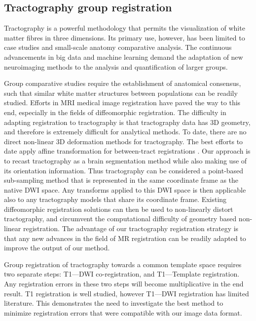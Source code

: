 \subsection{Tractography group registration}
Tractography is a powerful methodology that permits the visualization of white matter fibres in three dimensions. Its primary use, however, has been limited to case studies and small-scale anatomy comparative analysis. The continuous advancements in big data and machine learning demand the adaptation of new neuroimaging methods to the analysis and quantification of larger groups.

Group comparative studies require the establishment of anatomical consensus, such that similar white matter structures between populations can be readily studied. Efforts in MRI medical image registration have paved the way to this end, especially in the fields of diffeomorphic registration. The difficulty in adapting registration to tractography is that tractography data has 3D geometry, and therefore is extremely difficult for analytical methods. To date, there are no direct non-linear 3D deformation methods for tractography. The best efforts to date apply affine transformation for between-tract registrations \cite{Garyfallidis2015}. Our approach is to recast tractography as a brain segmentation method while also making use of its orientation information. Thus tractography can be considered a point-based sub-sampling method that is represented in the same coordinate frame as the native DWI space. Any transforms applied to this DWI space is then applicable also to any tractography models that share its coordinate frame. Existing diffeomorphic registration solutions can then be used to non-linearly distort tractography, and circumvent the computational difficulty of geometry based non-linear registration. The advantage of our tractography registration strategy is that any new advances in the field of MR registration can be readily adapted to improve the output of our method. 

Group registration of tractography towards a common template space requires two separate steps: T1---DWI co-registration, and T1---Template registration. Any registration errors in these two steps will become multiplicative in the end result. T1 registration is well studied, however T1---DWI registration has limited literature. This demonstrates the need to investigate the best method to minimize registration errors that were compatible with our image data format.

